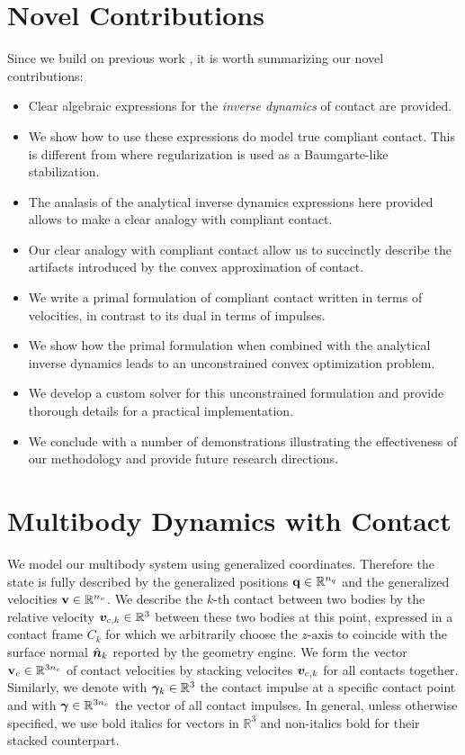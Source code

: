 \section{Novel Contributions}

Since we build on previous work \cite{bib:anitescu2006,
bib:anitescu2010,bib:todorov2014}, it is worth summarizing our novel
contributions:
\begin{itemize}
	\item Clear algebraic expressions for the \textit{inverse dynamics} of
	contact are provided.
	\item We show how to use these expressions do model true compliant contact.
	This is different from \cite{bib:todorov2014} where regularization is used
	as a Baumgarte-like stabilization.
	\item The analasis of the analytical inverse dynamics expressions here
	provided allows to make a clear analogy with compliant contact.
	\item Our clear analogy with compliant contact allow us to succinctly
	describe the artifacts introduced by the convex approximation of contact.
	\item We write a primal formulation of compliant contact written in terms of
	velocities, in contrast to its dual in terms of impulses.
	\item We show how the primal formulation when combined with the analytical
	 inverse dynamics leads to an unconstrained convex optimization problem.
	\item We develop a custom solver for this unconstrained formulation and
	provide thorough details for a practical implementation.
	\item We conclude with a number of demonstrations illustrating the
	effectiveness of our methodology and provide future research directions.
\end{itemize}

\section{Multibody Dynamics with Contact}
\label{sec:multibody_dynamics_with_contact}

We model our multibody system using generalized coordinates. Therefore the state
is fully described by the generalized positions ${\mathbf{q}}\in\mathbb{R}^{n_q}$ and
the generalized velocities ${\mathbf{v}}\in\mathbb{R}^{n_v}$. We describe the
$k\text{-th}$ contact between two bodies by the relative velocity
${\bm{v}}_{c,k}\in\mathbb{R}^3$ between these two bodies at this point, expressed
in a contact frame $C_k$ for which we arbitrarily choose the $z\text{-axis}$ to
coincide with the surface normal $\hat{{\bm{n}}}_k$ reported by the geometry
engine. We form the vector ${\mathbf{v}}_{c}\in\mathbb{R}^{3n_c}$ of contact
velocities by stacking velocites ${\bm{v}}_{c,k}$ for all contacts together.
Similarly, we denote with ${\bm\gamma}_k\in\mathbb{R}^3$ the contact impulse at a
specific contact point and with ${\bm\gamma}\in\mathbb{R}^{3n_c}$ the vector of all
contact impulses. In general, unless otherwise specified, we use bold italics
for vectors in $\mathbb{R}^3$ and non-italics bold for their stacked
counterpart.

